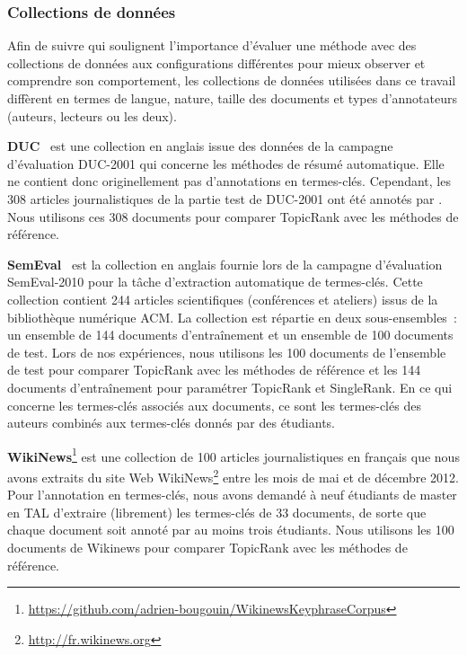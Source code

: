     \subsubsection{Collections de données}
    \label{subsubsec:donnees_de_test}
      Afin de suivre  qui soulignent l'importance
      d'évaluer une méthode avec des collections de données aux configurations
      différentes pour mieux observer et comprendre son comportement, les
      collections de données utilisées dans ce travail diffèrent en termes de
      langue, nature, taille des documents et types d'annotateurs (auteurs,
      lecteurs ou les deux).

      \textbf{DUC}~\cite{over2001duc} est une collection en anglais issue des
      données de la campagne d'évaluation DUC-2001 qui concerne les méthodes de
      résumé automatique. Elle ne contient donc originellement pas d'annotations
      en termes-clés. Cependant, les 308 articles journalistiques de la partie
      test de DUC-2001 ont été annotés par . Nous
      utilisons ces 308 documents pour comparer TopicRank avec les méthodes de
      référence.

      \textbf{SemEval}~\cite{kim2010semeval} est la collection en anglais
      fournie lors de la campagne d'évaluation SemEval-2010 pour la tâche
      d'extraction automatique de termes-clés. Cette collection contient 244
      articles scientifiques (conférences et ateliers) issus de la bibliothèque
      numérique ACM. La collection est répartie en deux sous-ensembles~: un
      ensemble de 144 documents d'entraînement et un ensemble de 100 documents
      de test. Lors de nos expériences, nous utilisons les 100 documents de
      l'ensemble de test pour comparer TopicRank avec les méthodes de
      référence et les 144 documents d'entraînement pour paramétrer TopicRank et
      SingleRank. En ce qui concerne les termes-clés associés aux documents, ce
      sont les termes-clés des auteurs combinés aux termes-clés donnés par des
      étudiants.

      \textbf{WikiNews}\footnote{\url{https://github.com/adrien-bougouin/WikinewsKeyphraseCorpus}}
      est une collection de 100 articles journalistiques en français que nous
      avons extraits du site Web
      WikiNews\footnote{\url{http://fr.wikinews.org}} entre les mois de mai et
      de décembre 2012. Pour l'annotation en termes-clés, nous avons demandé à
      neuf étudiants de master en TAL d'extraire (librement) les termes-clés de
      33 documents, de sorte que chaque document soit annoté par au moins trois
      étudiants. Nous utilisons les 100 documents de Wikinews pour comparer
      TopicRank avec les méthodes de référence.

